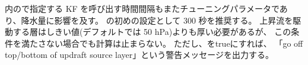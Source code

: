 内ので指定する
KF を呼び出す時間間隔もまたチューニングパラメータであり、降水量に影響を及す。
の初めの設定として 300 秒を推奨する。
上昇流を駆動する層はしきい値(デフォルトでは 50 hPa)よりも厚い必要があるが、
この条件を満たさない場合でも計算は止まらない。
ただし、をtrueにすれば、
「go off top/bottom of updraft source layer」という警告メッセージを出力する。
